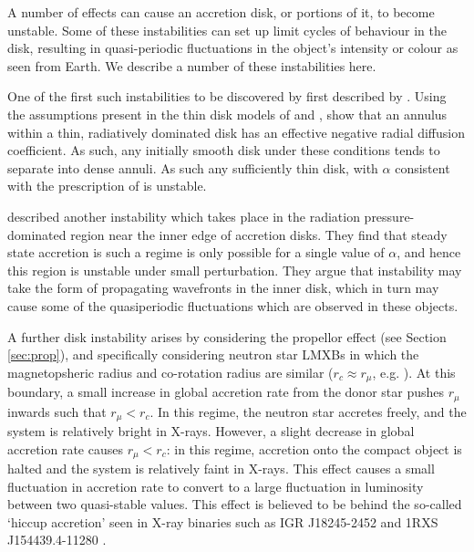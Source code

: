 \par A number of effects can cause an accretion disk, or portions of it, to become unstable.  Some of these instabilities can set up limit cycles of behaviour in the disk, resulting in quasi-periodic fluctuations in the object's intensity or colour as seen from Earth.  We describe a number of these instabilities here.
\par One of the first such instabilities to be discovered by first described by \citealp{Lightman_Instability}.  Using the assumptions present in the thin disk models of \citet{Shakura_Disk} and \citet{Novikov_Torque}, \citet{Lightman_Instability} show that an annulus within a thin, radiatively dominated disk has an effective negative radial diffusion coefficient.  As such, any initially smooth disk under these conditions tends to separate into dense annuli.  As such any sufficiently thin disk, with $\alpha$ consistent with the prescription of \citet{Shakura_Disk} is unstable.
\par \citet{Shakura_Instab} described another instability which takes place in the radiation pressure-dominated region near the inner edge of accretion disks.  They find that steady state accretion is such a regime is only possible for a single value of $\alpha$, and hence this region is unstable under small perturbation.  They argue that instability may take the form of propagating wavefronts in the inner disk, which in turn may cause some of the quasiperiodic fluctuations which are observed in these objects.
\par A further disk instability arises by considering the propellor effect (see Section \ref{sec:prop}), and specifically considering neutron star LMXBs in which the magnetopsheric radius and co-rotation radius are similar ($r_c\approx r_\mu$, e.g. \citet{Spruit_Type2Mod}).  At this boundary, a small increase in global accretion rate from the donor star pushes $r_\mu$ inwards such that $r_\mu<r_c$.  In this regime, the neutron star accretes freely, and the system is relatively bright in X-rays.  However, a slight decrease in global accretion rate causes $r_\mu<r_c$: in this regime, accretion onto the compact object is halted and the system is relatively faint in X-rays.  This effect causes a small fluctuation in accretion rate to convert to a large fluctuation in luminosity between two quasi-stable values.  This effect is believed to be behind the so-called `hiccup accretion' seen in X-ray binaries such as IGR J18245-2452 \citep{Ferrigno_TMSPVar} and 1RXS J154439.4-11280 \citep{Bogdanov_Proxy}.

